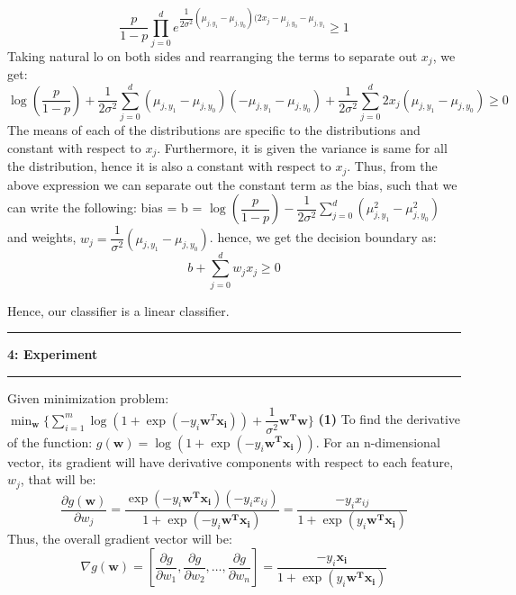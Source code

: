 \documentclass{article}
\newcommand\question[2]{\vspace{.25in}\hrule\textbf{#1: #2}\hrule\vspace{.10in}}
\renewcommand\part[1]{\vspace{.10in}\textbf{(#1)}}
\begin{document}
	\[\dfrac{p}{1-p} \prod_{j=0}^d e^{\dfrac{1}{2\sigma^2}(\mu_{j,y_1} - \mu_{j,y_0})(2x_j - \mu_{j,y_0} - \mu_{j,y_1}} \geq 1\]
	Taking natural lo on both sides and rearranging the terms to separate out $x_j$, we get:
	\[\log(\dfrac{p}{1-p}) + \dfrac{1}{2\sigma^2}\sum_{j=0}^d (\mu_{j,y_1} - \mu_{j,y_0})(-\mu_{j,y_1} - \mu_{j,y_0}) + \dfrac{1}{2\sigma^2} \sum_{j=0}^d 2x_j (\mu_{j,y_1} - \mu_{j,y_0}) \geq 0\]
	The means of each of the distributions are specific to the distributions and constant with respect to $x_j$. Furthermore, it is given the variance is same for all the distribution, hence it is also a constant with respect to $x_j$. Thus, from the above expression we can separate out the constant term as the bias, such that we can write the following: \newline
	bias = b = $\log(\dfrac{p}{1-p}) - \dfrac{1}{2\sigma^2}\sum_{j=0}^d (\mu_{j,y_1}^2 - \mu_{j,y_0}^2)$ and \newline
	weights, $w_j = \dfrac{1}{\sigma^2}(\mu_{j,y_1} - \mu_{j,y_0})$. \newline
	hence, we get the decision boundary as:
	\[ b + \sum_{j=0}^d w_jx_j \geq 0\]

	Hence, our classifier is a linear classifier. \newline

	\question{4}{Experiment}
	Given minimization problem: $\min_{\mathbf{w}}\{ \sum_{i=1}^m \log(1 + \exp(-y_i\mathbf{w}^T\mathbf{x_i})) + \dfrac{1}{\sigma^2}\mathbf{w^Tw} \}$
	\part{1} To find the derivative of the function: $g(\mathbf{w}) = \log(1 + \exp(-y_i\mathbf{w^Tx_i}))$. For an n-dimensional vector, its gradient will have derivative components with respect to each feature,$w_j$, that will be:
	\[ \dfrac{\partial g(\mathbf{w})}{\partial w_j} = \dfrac{\exp(-y_i\mathbf{w^Tx_i})(-y_ix_{ij})}{1 + \exp(-y_i\mathbf{w^Tx_i})} = \dfrac{-y_ix_{ij}}{1 + \exp(y_i\mathbf{w^Tx_i})}\]
	Thus, the overall gradient vector will be:
	\[\nabla g(\mathbf{w}) = [\dfrac{\partial g}{\partial w_1},\dfrac{\partial g}{\partial w_2}, \dots, \dfrac{\partial g}{\partial w_n}] = \dfrac{-y_i\mathbf{x_i}}{1 + \exp(y_i\mathbf{w^Tx_i})}\]
\end{document}
